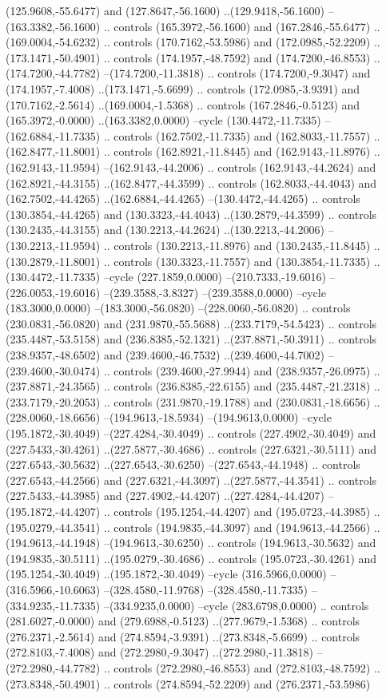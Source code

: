 \begin{scope}[shift={(55,258)}]
(125.9608,-55.6477) and (127.8647,-56.1600) ..(129.9418,-56.1600) --(163.3382,-56.1600) .. controls (165.3972,-56.1600) and (167.2846,-55.6477) ..(169.0004,-54.6232) .. controls (170.7162,-53.5986) and (172.0985,-52.2209) ..(173.1471,-50.4901) .. controls (174.1957,-48.7592) and (174.7200,-46.8553) ..(174.7200,-44.7782) --(174.7200,-11.3818) .. controls (174.7200,-9.3047) and (174.1957,-7.4008) ..(173.1471,-5.6699) .. controls (172.0985,-3.9391) and (170.7162,-2.5614) ..(169.0004,-1.5368) .. controls (167.2846,-0.5123) and (165.3972,-0.0000) ..(163.3382,0.0000) --cycle (130.4472,-11.7335) --(162.6884,-11.7335) .. controls (162.7502,-11.7335) and (162.8033,-11.7557) ..(162.8477,-11.8001) .. controls (162.8921,-11.8445) and (162.9143,-11.8976) ..(162.9143,-11.9594) --(162.9143,-44.2006) .. controls (162.9143,-44.2624) and (162.8921,-44.3155) ..(162.8477,-44.3599) .. controls (162.8033,-44.4043) and (162.7502,-44.4265) ..(162.6884,-44.4265) --(130.4472,-44.4265) .. controls (130.3854,-44.4265) and (130.3323,-44.4043) ..(130.2879,-44.3599) .. controls (130.2435,-44.3155) and (130.2213,-44.2624) ..(130.2213,-44.2006) --(130.2213,-11.9594) .. controls (130.2213,-11.8976) and (130.2435,-11.8445) ..(130.2879,-11.8001) .. controls (130.3323,-11.7557) and (130.3854,-11.7335) ..(130.4472,-11.7335) --cycle (227.1859,0.0000) --(210.7333,-19.6016) --(226.0053,-19.6016) --(239.3588,-3.8327) --(239.3588,0.0000) --cycle (183.3000,0.0000) --(183.3000,-56.0820) --(228.0060,-56.0820) .. controls (230.0831,-56.0820) and (231.9870,-55.5688) ..(233.7179,-54.5423) .. controls (235.4487,-53.5158) and (236.8385,-52.1321) ..(237.8871,-50.3911) .. controls (238.9357,-48.6502) and (239.4600,-46.7532) ..(239.4600,-44.7002) --(239.4600,-30.0474) .. controls (239.4600,-27.9944) and (238.9357,-26.0975) ..(237.8871,-24.3565) .. controls (236.8385,-22.6155) and (235.4487,-21.2318) ..(233.7179,-20.2053) .. controls (231.9870,-19.1788) and (230.0831,-18.6656) ..(228.0060,-18.6656) --(194.9613,-18.5934) --(194.9613,0.0000) --cycle (195.1872,-30.4049) --(227.4284,-30.4049) .. controls (227.4902,-30.4049) and (227.5433,-30.4261) ..(227.5877,-30.4686) .. controls (227.6321,-30.5111) and (227.6543,-30.5632) ..(227.6543,-30.6250) --(227.6543,-44.1948) .. controls (227.6543,-44.2566) and (227.6321,-44.3097) ..(227.5877,-44.3541) .. controls (227.5433,-44.3985) and (227.4902,-44.4207) ..(227.4284,-44.4207) --(195.1872,-44.4207) .. controls (195.1254,-44.4207) and (195.0723,-44.3985) ..(195.0279,-44.3541) .. controls (194.9835,-44.3097) and (194.9613,-44.2566) ..(194.9613,-44.1948) --(194.9613,-30.6250) .. controls (194.9613,-30.5632) and (194.9835,-30.5111) ..(195.0279,-30.4686) .. controls (195.0723,-30.4261) and (195.1254,-30.4049) ..(195.1872,-30.4049) --cycle (316.5966,0.0000) --(316.5966,-10.6063) --(328.4580,-11.9768) --(328.4580,-11.7335) --(334.9235,-11.7335) --(334.9235,0.0000) --cycle (283.6798,0.0000) .. controls (281.6027,-0.0000) and (279.6988,-0.5123) ..(277.9679,-1.5368) .. controls (276.2371,-2.5614) and (274.8594,-3.9391) ..(273.8348,-5.6699) .. controls (272.8103,-7.4008) and (272.2980,-9.3047) ..(272.2980,-11.3818) --(272.2980,-44.7782) .. controls (272.2980,-46.8553) and (272.8103,-48.7592) ..(273.8348,-50.4901) .. controls (274.8594,-52.2209) and (276.2371,-53.5986) 
\end{scope}

